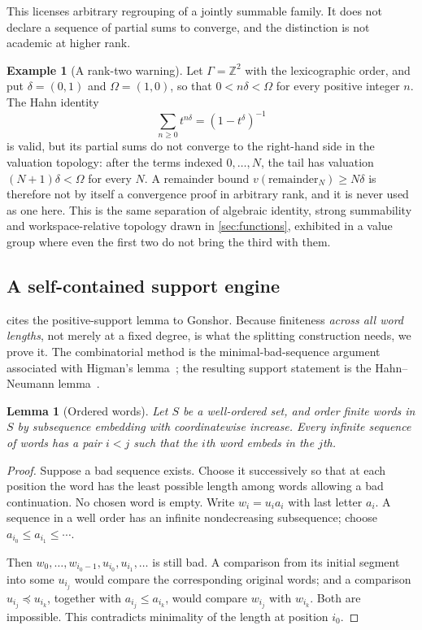 \documentclass[11pt,a4paper]{article}
\numberwithin{equation}{section}
\newtheorem{lemma}[lemma]{Lemma}
\theoremstyle{definition}
\newtheorem{example}[example]{Example}
\theoremstyle{remark}
\newcommand{\Z}{\mathbb Z}
\begin{document}
This licenses arbitrary regrouping of a jointly summable family. It does not
declare a sequence of partial sums to converge, and the distinction is not
academic at higher rank.

\begin{example}[A rank-two warning]\label{spec:ex:nonconvergence}
Let $\Gamma=\Z^2$ with the lexicographic order, and put $\delta=(0,1)$ and
$\Omega=(1,0)$, so that $0<n\delta<\Omega$ for every positive integer $n$.
The Hahn identity
\[
 \sum_{n\ge0}t^{n\delta}=(1-t^\delta)^{-1}
\]
is valid, but its partial sums do not converge to the right-hand side in the
valuation topology: after the terms indexed $0,\ldots,N$, the tail has
valuation $(N+1)\delta<\Omega$ for every $N$. A remainder bound
$v(\text{remainder}_N)\ge N\delta$ is therefore not by itself a convergence
proof in arbitrary rank, and it is never used as one here. This is the same
separation of algebraic identity, strong summability and workspace-relative
topology drawn in \cref{sec:functions}, exhibited in a value group where
even the first two do not bring the third with them.
\end{example}

\subsection{A self-contained support engine}

 cites the positive-support lemma to Gonshor. Because
finiteness \emph{across all word lengths}, not merely at a fixed degree, is
what the splitting construction needs, we prove it. The combinatorial method
is the minimal-bad-sequence argument associated with Higman's
lemma~\cite{Higman}; the resulting support statement is the Hahn--Neumann
lemma~\cite{Neumann}.

\begin{lemma}[Ordered words]\label{spec:lem:words}
Let $S$ be a well-ordered set, and order finite words in $S$ by subsequence
embedding with coordinatewise increase. Every infinite sequence of words has
a pair $i<j$ such that the $i$th word embeds in the $j$th.
\end{lemma}
\begin{proof}
Suppose a bad sequence exists. Choose it successively so that at each
position the word has the least possible length among words allowing a bad
continuation. No chosen word is empty. Write $w_i=u_ia_i$ with last letter
$a_i$. A sequence in a well order has an infinite nondecreasing subsequence;
choose $a_{i_0}\le a_{i_1}\le\cdots$.

Then $w_0,\ldots,w_{i_0-1},u_{i_0},u_{i_1},\ldots$ is still bad. A
comparison from its initial segment into some $u_{i_j}$ would compare the
corresponding original words; and a comparison $u_{i_j}\preceq u_{i_k}$,
together with $a_{i_j}\le a_{i_k}$, would compare $w_{i_j}$ with $w_{i_k}$.
Both are impossible. This contradicts minimality of the length at position
$i_0$.
\end{proof}
\end{document}
